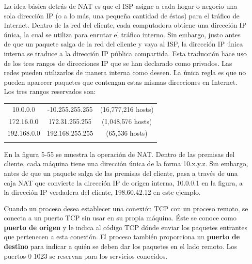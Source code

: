 	La idea básica detrás de NAT es que el ISP asigne a cada hogar o negocio una sola dirección IP
(o a lo más, una pequeña cantidad de éstas) para el tráfico de Internet. Dentro de la red del cliente, cada
computadora obtiene una dirección IP única, la cual se utiliza para enrutar el tráfico interno. Sin embargo, justo antes de que un paquete salga de la red del cliente y vaya al ISP, la dirección IP única interna se traduce a la dirección IP pública compartida. Esta traducción hace uso de los tres rangos de direcciones
IP que se han declarado como privados. Las redes pueden utilizarlos de manera interna como deseen. La
única regla es que no pueden aparecer paquetes que contengan estas mismas direcciones en Internet. Los
tres rangos reservados son:
\par
\par
	\begin{center}
	

	\begin{tabular}{ccc}
	10.0.0.0 & -10.255.255.255 & (16,777,216 hosts) \\ 
	\par
	172.16.0.0 & 172.31.255.255 & (1,048,576 hosts) \\ 
	\par
	192.168.0.0 & 192.168.255.255 & (65,536 hosts) \\ 
	\par
	\end{tabular} 
	\end{center}
	\par
	\par En la figura 5-55 se muestra la operación de NAT. Dentro de las premisas del cliente, cada máquina
tiene una dirección única de la forma 10.x.y.z. Sin embargo, antes de que un paquete salga de las premisas
del cliente, pasa a través de una caja NAT que convierte la dirección IP de origen interna, 10.0.0.1 en
la figura, a la dirección IP verdadera del cliente, 198.60.42.12 en este ejemplo.

\par Cuando un proceso desea establecer una conexión TCP con un proceso remoto, se conecta a un puerto
TCP sin usar en su propia máquina. Éste se conoce como \textbf{puerto de origen} y le indica al código TCP dónde enviar los paquetes entrantes que pertenecen a esta conexión. El proceso también proporciona un \textbf{puerto de destino} para indicar a quién se deben dar los paquetes en el lado remoto. Los puertos 0-1023 se reservan para los servicios conocidos.

